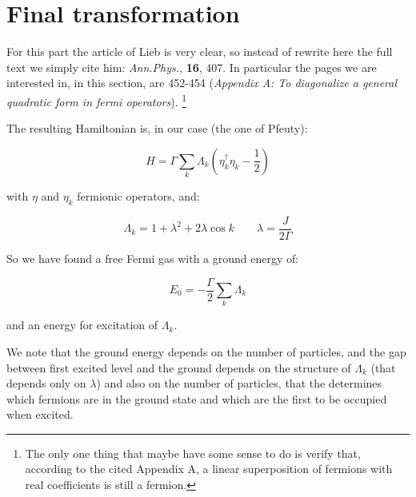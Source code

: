 
\section{Final transformation}
\label{sec:final}
For this part the article of Lieb is very clear, so instead of rewrite here the full text we simply cite him: \textit{Ann.Phys.}, \textbf{16}, 407. In particular the pages we are interested in, in this section, are 452-454 (\textit{Appendix A: To diagonalize a general quadratic form in fermi operators}).
\footnote{The only one thing that maybe have some sense to do is verify that, according to the cited Appendix A, a linear superposition of fermions with real coefficients is still a fermion.}

The resulting Hamiltonian is, in our case (the one of Pfeuty):

\begin{equation}
H = \Gamma \sum_k \Lambda_k (\eta_k^\dagger \eta_k - \frac{1}{2})
\end{equation}

\noindent with $\eta$ and $\eta_k$ fermionic operators, and:

\begin{equation}
\Lambda_k = 1 + \lambda^2 + 2\lambda \cos k	\qquad	\lambda = \frac{J}{2 \Gamma}
\end{equation}

So we have found a free Fermi gas with a ground energy of:

\begin{equation}
E_0 = - \frac{\Gamma}{2} \sum_k \Lambda_k
\end{equation}

\noindent and an energy for excitation of $\Lambda_k$.

We note that the ground energy depends on the number of particles, and the gap between first excited level and the ground depends on the structure of $\Lambda_k$ (that depends only on $\lambda$) and also on the number of particles, that the determines which fermions are in the ground state and which are the first to be occupied when excited.
